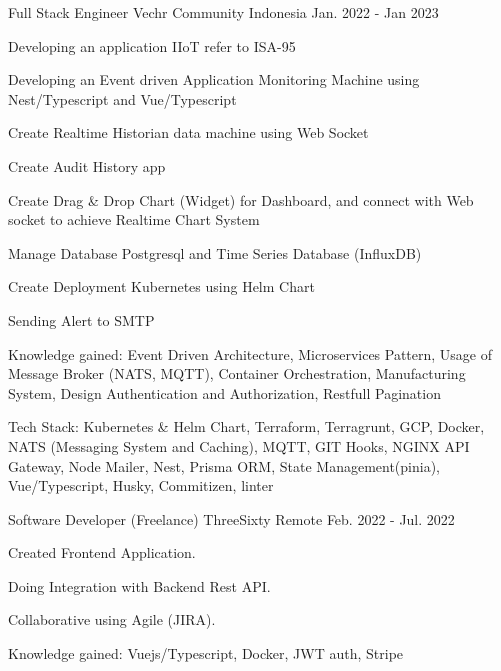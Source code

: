 \begin{cventries}
  \cventry
    {Full Stack Engineer} %
    {Vechr Community} %
    {Indonesia} %
    {Jan. 2022 - Jan 2023} %
    {
      \begin{cvitems} %
        \item {Developing an application IIoT refer to ISA-95}
        \item {Developing an Event driven Application Monitoring Machine using Nest/Typescript and Vue/Typescript}
        \item {Create Realtime Historian data machine using Web Socket}
        \item {Create Audit History app}
        \item {Create Drag \& Drop Chart (Widget) for Dashboard, and connect with Web socket to achieve Realtime Chart System}
        \item {Manage Database Postgresql and Time Series Database (InfluxDB)}
        \item {Create Deployment Kubernetes using Helm Chart}
        \item {Sending Alert to SMTP}
        \item {Knowledge gained: Event Driven Architecture, Microservices Pattern, Usage of Message Broker (NATS, MQTT), Container Orchestration, Manufacturing System, Design Authentication and Authorization, Restfull Pagination}
        \item {Tech Stack: Kubernetes \& Helm Chart, Terraform, Terragrunt, GCP, Docker, NATS (Messaging System and Caching), MQTT, GIT Hooks, NGINX API Gateway, Node Mailer, Nest, Prisma ORM, State Management(pinia), Vue/Typescript, Husky, Commitizen, linter}
      \end{cvitems}
    }

  \cventry
    {Software Developer (Freelance)} %
    {ThreeSixty} %
    {Remote} %
    {Feb. 2022 - Jul. 2022} %
    {
      \begin{cvitems} %
        \item {Created Frontend Application.}
        \item {Doing Integration with Backend Rest API.}
        \item {Collaborative using Agile (JIRA).}
        \item {Knowledge gained: Vuejs/Typescript, Docker, JWT auth, Stripe}
      \end{cvitems}
    }
  


\end{cventries}
